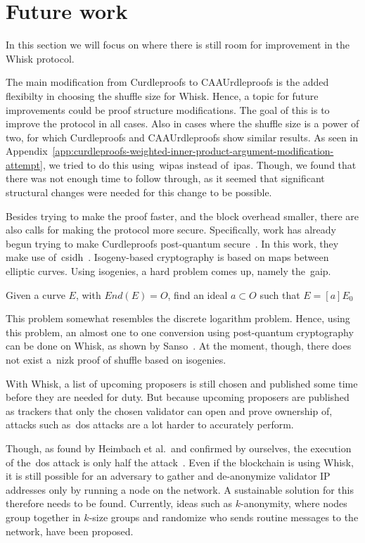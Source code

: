 \section{Future work}\label{sec:future-works}
In this section we will focus on where there is still room for improvement in the Whisk protocol.

The main modification from Curdleproofs to CAAUrdleproofs is the added flexibilty in choosing the shuffle size for Whisk.
Hence, a topic for future improvements could be proof structure modifications.
The goal of this is to improve the protocol in all cases.
Also in cases where the shuffle size is a power of two, for which Curdleproofs and CAAUrdleproofs show similar results.
As seen in Appendix~\ref{app:curdleproofs-weighted-inner-product-argument-modification-attempt}, we tried to do this using~\glspl{wipa} instead of~\glspl{ipa}.
Though, we found that there was not enough time to follow through, as it seemed that significant structural changes were needed for this change to be possible.


Besides trying to make the proof faster, and the block overhead smaller, there are also calls for making the protocol more secure.
Specifically, work has already begun trying to make Curdleproofs post-quantum secure~\cite{pqwhisk}.
In this work, they make use of~\gls{csidh}~\cite{10.1007/978-3-030-03332-3_15}.
Isogeny-based cryptography is based on maps between elliptic curves.
Using isogenies, a hard problem comes up, namely the~\gls{gaip}.
\begin{definition}
    Given a curve $E$, with $End(E)=O$, find an ideal $a\subset O$ such that $E=[a]E_0$
\end{definition}
This problem somewhat resembles the discrete logarithm problem.
Hence, using this problem, an almost one to one conversion using post-quantum cryptography can be done on Whisk, as shown by Sanso~\cite{pqwhisk}.
At the moment, though, there does not exist a~\gls{nizk} proof of shuffle based on isogenies.


With Whisk, a list of upcoming proposers is still chosen and published some time before they are needed for duty.
But because upcoming proposers are published as trackers that only the chosen validator can open and prove ownership of, attacks such as~\gls{dos} attacks are a lot harder to accurately perform.

Though, as found by Heimbach et al.~and confirmed by ourselves, the execution of the~\gls{dos} attack is only half the attack~\cite{heimbach2024deanonymizingethereumvalidatorsp2p,ouroldpaper}.
Even if the blockchain is using Whisk, it is still possible for an adversary to gather and de-anonymize validator IP addresses only by running a node on the network.
A sustainable solution for this therefore needs to be found.
Currently, ideas such as $k$-anonymity, where nodes group together in $k$-size groups and randomize who sends routine messages to the network, have been proposed.
